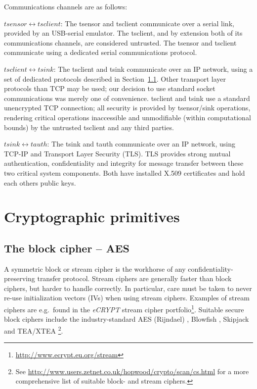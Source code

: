 Communications channels are as follows:
%
\begin{description}
\item {$tsensor \longleftrightarrow tsclient$:}
The tsensor and tsclient communicate over a serial link, provided by an USB-serial emulator. The tsclient, and by extension both of its communications channels, are considered untrusted. The tsensor and tsclient communicate using a dedicated serial communications protocol.

\item {$tsclient \longleftrightarrow tsink$:}
The tsclient and tsink communicate over an IP network, using a set of dedicated protocols described in Section~\ref{}. Other transport layer protocols than TCP may be used; our decision to use standard socket communications was merely one of convenience. 
tsclient and tsink use a standard unencrypted TCP connection; all security is provided by tsensor/sink operations, rendering critical operations inaccessible and unmodifiable (within computational bounds) by the untrusted tsclient and any third parties.

\item {$tsink \longleftrightarrow tauth$:}
The tsink and tauth communicate over an IP network, using TCP-IP and Transport Layer Security (TLS). TLS provides strong mutual authentication, confidentiality and integrity for message transfer between these two critical system components. Both have installed X.509 certificates and hold each others public keys.

\end{description}

\section{Cryptographic primitives}

\subsection{The block cipher -- AES}

A symmetric block or stream cipher is the workhorse of any confidentiality-preserving transfer protocol. 
%
Stream ciphers are generally faster than block ciphers, but harder to handle correctly. In particular, care must be taken to never re-use initialization vectors (IVs) when using stream ciphers. Examples of stream ciphers are e.g.\ found in the \textit{eCRYPT} stream cipher portfolio\footnote{\url{http://www.ecrypt.eu.org/stream}}. 
%
Suitable secure block ciphers include the industry-standard AES (Rijndael) , Blowfish , Skipjack  and TEA/XTEA \footnote{See  \url{http://www.users.zetnet.co.uk/hopwood/crypto/scan/cs.html} for a more comprehensive list of suitable block- and stream ciphers.}.

